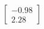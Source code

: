 \documentclass[preview]{standalone}
\begin{document}
\begin{align*}
\begin{bmatrix} -0.98 \\ 2.28 \end{bmatrix}
\end{align*}
\end{document}
